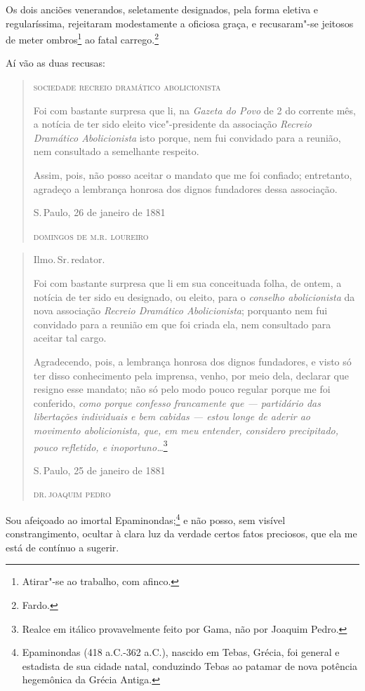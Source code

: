 Os dois anciões venerandos, seletamente designados, pela forma eletiva e
regularíssima, rejeitaram modestamente a oficiosa graça, e recusaram"-se
jeitosos de meter ombros\footnote{Atirar"-se ao trabalho, com afinco.}
ao fatal carrego.\footnote{Fardo.}

Aí vão as duas recusas:

\begin{quote}
\textsc{sociedade recreio dramático abolicionista}

Foi com bastante surpresa que li, na \emph{Gazeta do Povo} de 2 do
corrente mês, a notícia de ter sido eleito vice"-presidente da associação
\emph{Recreio Dramático Abolicionista} isto porque, nem fui convidado
para a reunião, nem consultado a semelhante respeito.

Assim, pois, não posso aceitar o mandato que me foi confiado;
entretanto, agradeço a lembrança honrosa dos dignos fundadores dessa
associação.

\noindent{}S.\,Paulo, 26 de janeiro de 1881

\noindent\textsc{domingos de m.r. loureiro}
\end{quote}

\asterisc

\begin{quote}
Ilmo.\,Sr.\,redator.

Foi com bastante surpresa que li em sua conceituada folha, de ontem, a
notícia de ter sido eu designado, ou eleito, para o \emph{conselho
abolicionista} da nova associação \emph{Recreio Dramático
Abolicionista}; porquanto nem fui convidado para a reunião em que foi
criada ela, nem consultado para aceitar tal cargo.

Agradecendo, pois, a lembrança honrosa dos dignos fundadores, e visto só
ter disso conhecimento pela imprensa, venho, por meio dela, declarar que
resigno esse mandato; não só pelo modo pouco regular porque me foi
conferido, \emph{como porque confesso francamente que --- partidário
das libertações individuais e bem cabidas --- estou longe de aderir ao
movimento abolicionista, que, em meu entender, considero precipitado,
pouco refletido, e inoportuno\ldots{}}\footnote{Realce em itálico
  provavelmente feito por Gama, não por Joaquim Pedro.}

\noindent{}S.\,Paulo, 25 de janeiro de 1881

\noindent\textsc{dr.\,joaquim pedro}
\end{quote}

Sou afeiçoado ao imortal Epaminondas;\footnote{Epaminondas (418
  a.C.-362 a.C.), nascido em Tebas, Grécia, foi general e estadista de
  sua cidade natal, conduzindo Tebas ao patamar de nova
  potência hegemônica da Grécia Antiga.} e não posso, sem visível
constrangimento, ocultar à clara luz da verdade certos fatos preciosos,
que ela me está de contínuo a sugerir.

